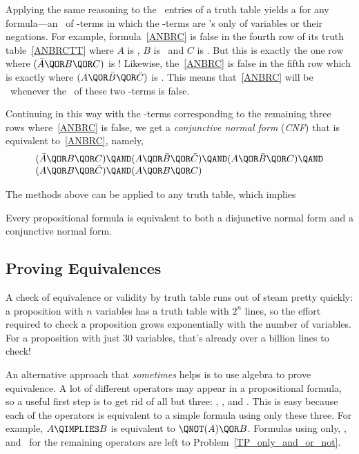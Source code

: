 Applying the same reasoning to the \false\ entries of a truth table
yields a  for any formula---an \QAND\
of \QOR-terms in which the \QOR-terms are \QOR's only of variables or
their negations.  For example, formula~\eqref{ANBRC} is false in the
fourth row of its truth table~\eqref{ANBRCTT} where $A$ is \true, $B$
is \false\ and $C$ is \false.  But this is exactly the one row where
$(\bar{A} \QOR B \QOR C)$ is \false!  Likewise, the~\eqref{ANBRC} is
false in the fifth row which is exactly where
$(A \QOR \bar{B} \QOR \bar{C})$ is \false.  This means
that~\eqref{ANBRC} will be \false\ whenever the \QAND\ of these
two \QOR-terms is false.  
\iffalse
$(\bar{A} \QOR B \QOR C) \QAND (A \QOR \bar{B} \QOR \bar{C})$ is \false.
\fi
Continuing in this way with the \QOR-terms corresponding to the
remaining three rows where~\eqref{ANBRC} is false, we get a
\emph{conjunctive normal form}%
(\emph{CNF})%
that is equivalent to~\eqref{ANBRC}, namely,
\[\begin{array}{l}
(\bar{A} \QOR B \QOR C)  \QAND (A \QOR \bar{B} \QOR \bar{C}) 
        \QAND (A \QOR \bar{B} \QOR C)  \QAND \\
(A \QOR B \QOR \bar{C}) \QAND (A \QOR B \QOR C)
\end{array}\]

The methods above can be applied to any truth table, which implies
\begin{theorem}
Every propositional formula is equivalent to both a disjunctive normal
form and a conjunctive normal form.
\end{theorem}

\subsection{Proving Equivalences}\label{propositional_equivalences_sec}
A check of equivalence%
or validity by truth table runs out of steam
pretty quickly: a proposition with $n$ variables has a truth table
with $2^n$ lines, so the effort required to check a proposition
grows exponentially with the number of variables.  For a
proposition with just 30 variables, that's already over a billion
lines to check!

An alternative approach that \emph{sometimes} helps is to use algebra
to prove equivalence.  A lot of different operators may appear in a
propositional formula, so a useful first step is to get rid of all but
three: \QAND, \QOR, and \QNOT.  This is easy because each of the
operators is equivalent to a simple formula using only these three.
For example, $A \QIMPLIES B$ is equivalent to $\QNOT(A) \QOR B$.
Formulas using only\QAND, \QOR, and \QNOT\ for the remaining operators
are left to Problem~\ref{TP_only_and_or_not}.

